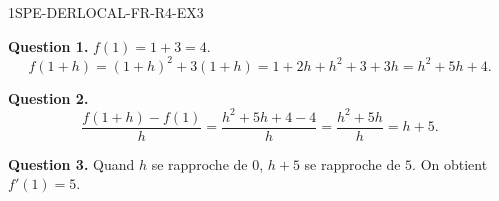 \begin{corrige}{1SPE-DERLOCAL-FR-R4-EX3}

\textbf{Question 1.}
$f(1) = 1 + 3 = 4$.
\[
f(1+h) = (1+h)^2 + 3(1+h) = 1+2h+h^2+3+3h = h^2 + 5h + 4.
\]

\textbf{Question 2.}
\[
\frac{f(1+h)-f(1)}{h} = \frac{h^2+5h+4-4}{h} = \frac{h^2+5h}{h} = h + 5.
\]


\textbf{Question 3.} Quand $h$ se rapproche de $0$, $h+5$ se rapproche de $5$. On obtient $f'(1) = 5$.

\end{corrige}
